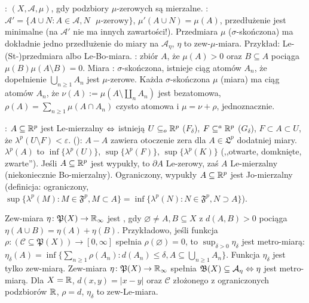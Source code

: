 :  $(X, \mathcal A, \mu)$, gdy podzbiory $\mu$-zerowych są mierzalne.
: $\mathcal A' = \{A \cup N : A \in \mathcal A, N \mbox{ $\mu$-zerowy}\}$, $\mu'(A \cup N) = \mu(A)$,  przedłużenie jest minimalne (na $\mathcal A'$ nie ma innych zawartości!).
Przedmiara $\mu$ ($\sigma$-skończona) ma dokładnie jedno przedłużenie do miary na $\mathcal A_\eta$, $\eta$ to zew-$\mu$-miara.
Przykład: Le-(St-)przedmiara albo Le-Bo-miara.
: zbiór $A$, że $\mu(A) >0$ oraz $B \subseteq A$ pociąga $\mu(B)\mu(A \setminus B) = 0$.
Miara : $\sigma$-skończona, istnieje ciąg atomów $A_n$, że dopełnienie $\bigcup_{n \ge 1} A_n$ jest $\mu$-zerowe.
Każda $\sigma$-skończona $\mu$ (miara) ma ciąg atomów $A_n$, że $\nu(A) := \mu(A \setminus \coprod_n A_n)$ jest bezatomowa, $\rho(A) = \sum_{n \ge 1} \mu(A \cap A_n)$ czysto atomowa i $\mu = \nu + \rho$, jednoznacznie.

:  $A \subseteq \mathbb{R}^p$ jest Le-mierzalny $\Leftrightarrow$ istnieją $U \subseteq_o \mathbb{R}^p$ ($F_\delta$), $F \subseteq^a \mathbb{R}^p$ ($G_\delta$), $F \subset A \subset U$, że $\lambda^p(U \setminus F) < \varepsilon$.
 (): $A - A$ zawiera otoczenie zera dla $A \in \mathfrak L^p$ dodatniej miary.
$\lambda^p(A)$ to $\inf\{\lambda^p(U)\}$, $\sup\{\lambda^p(F)\}$, $\sup\{\lambda^p(K)\}$ (,,otwarte, domknięte, zwarte'').
Jeśli $A \subseteq \mathbb{R}^p$ jest wypukły, to $\partial A$ Le-zerowy, zaś $A$ Le-mierzalny (niekoniecznie Bo-mierzalny).
Ograniczony, wypukły $A \subseteq \mathbb{R}^p$ jest Jo-mierzalny (definicja: ograniczony, $\sup\{\lambda^p(M) : M \in \mathfrak F^p, M \subset A\} = \inf\{\lambda^p(N) : N \in \mathfrak F^p, N \supset A\}$).

Zew-miara  $\eta \colon \mathfrak P(X) \to \mathbb{R}_\infty$ jest , gdy $\varnothing \neq A, B \subseteq X$ z $d(A, B) > 0$ pociąga $\eta(A \cup B) = \eta(A) + \eta(B)$.
Przykładowo, jeśli funkcja $\rho \colon (\mathcal C \subseteq \mathfrak P(X)) \to [0, \infty]$ spełnia $\rho(\varnothing) = 0$, to $\sup_{\delta > 0} \eta_\delta$ jest metro-miarą: $\eta_\delta(A) = \inf\{\sum_{n \ge 1} \rho(A_n) : d(A_n) \le \delta, A \subseteq \bigcup_{n \ge 1} A_n\}$. 
Funkcja $\eta_\delta$ jest tylko zew-miarą.
Zew-miara $\eta \colon \mathfrak P(X) \to \mathbb{R}_\infty$ spełnia $\mathfrak B(X) \subseteq \mathcal A_\eta \Leftrightarrow \eta$ jest metro-miarą.
Dla $X = \mathbb{R}$, $d(x,y) = |x-y|$ oraz $\mathcal C$ złożonego z ograniczonych podzbiorów $\mathbb{R}$, $\rho = d$, $\eta_\delta$ to zew-Le-miara.

